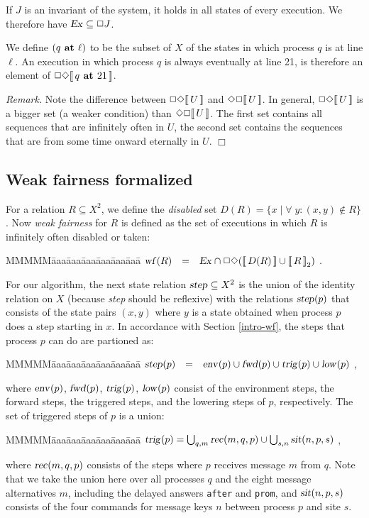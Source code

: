 \documentclass[10pt]{article} \usepackage[english]{babel}
\newenvironment{tab}{\begin{tabbing}
MMMMM\=aaa\=aaa\=aaa\=aaa\=aaa\=aaa\= \kill}{\end{tabbing}}
\newenvironment{remark}{\medbreak\noindent\emph{Remark.}}{\boks}
\def\sem #1{\hbox{$[\![\, #1\, ]\!] $}}
\def\boks  {\mbox{$\Box$}}
\def\all   {\forall\;}
\def\S #1/{\mbox {\textsl{#1}}}
\def\B #1/{\mbox {\textbf{#1}}}
\def\T #1/{\mbox {\texttt{#1}}}
\def\IS     {\mbox{$\quad =\quad $}}
\begin{document}
If $J$ is an invariant of the system, it holds in all states of every
execution. We therefore have $\S Ex/\subseteq \Box{J}$.

We define $(q\B\ at /\ell)$ to be the subset of $X$ of the states in
which process $q$ is at line $\ell$. An execution in which process $q$
is always eventually at line 21, is therefore an element of
$\Box\Diamond\sem{q\B\ at /21}$.  

\begin{remark} Note the difference between $\Box\Diamond\sem{U}$ and
  $\Diamond\Box\sem{U}$.  In general, $\Box\Diamond\sem{U}$ is a
  bigger set (a weaker condition) than $\Diamond\Box\sem{U}$. The
  first set contains all sequences that are infinitely often in $U$,
  the second set contains the sequences that are from some time onward
  eternally in $U$.  
\end{remark}

\subsection{Weak fairness formalized} 
\label{inf_live}

For a relation $R\subseteq X^2$, we define the \emph{disabled} set
$D(R)=\{x\mid \all y: (x,y)\notin R\}$. Now \emph{weak fairness}
\cite{Lam94} for $R$ is defined as the set of executions in which
$R$ is infinitely often  disabled or taken:
\begin{tab}
\> $ \S wf/(R) \IS \S Ex/\cap 
\Box\Diamond (\sem{D(R)} \cup \sem{R}_2) $ .
\end{tab}

For our algorithm, the next state relation $\S step/\subseteq X^2$ is
the union of the identity relation on $X$ (because \S step/ should be
reflexive) with the relations $\S step/(p)$ that consists of the state
pairs $(x,y)$ where $y$ is a state obtained when process $p$ does a
step starting in $x$.  In accordance with Section \ref{intro-wf}, the
steps that process $p$ can do are partioned as:
\begin{tab}
\> $\S step/(p) \IS \S env/(p)\cup \S fwd/(p)\cup \S trig/(p) 
\cup\S low/(p) $ ,
\end{tab}
where $\S env/(p)$, $\S fwd/(p)$, $\S trig/(p)$, $\S low/(p)$ consist
of the environment steps, the forward steps, the triggered steps, and
the lowering steps of $p$, respectively.  The set of triggered steps
of $p$ is a union:
\begin{tab}
\> $ \S trig/(p) = \bigcup_{q,m} \S rec/(m, q, p) \cup 
\bigcup_{s, n} \S sit/(n,p,s) $ , 
\end{tab}
where $\S rec/(m,q,p)$ consists of the steps where $p$ receives
message $m$ from $q$. Note that we take the union here over all
processes $q$ and the eight message alternatives $m$, including the
delayed answers \T after/ and \T prom/, and $\S sit/(n,p,s)$ consists
of the four commands for message keys $n$ between process $p$ and site
$s$.
\end{document}
